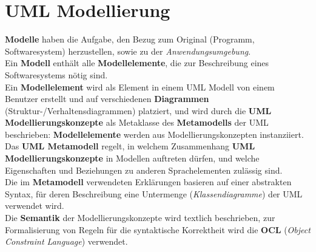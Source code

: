\section{UML Modellierung}

\begin{tcolorbox}[title=UML Modellierung]
    \textbf{Modelle} haben die Aufgabe, den Bezug zum Original (Programm, Softwaresystem) herzustellen, sowie zu der \textit{Anwendungsumgebung}.\\
    Ein \textbf{Modell} enthält alle \textbf{Modellelemente}, die zur Beschreibung eines Softwaresystems nötig sind.\\

    \noindent
    Ein \textbf{Modellelement} wird als Element in einem UML Modell von einem Benutzer erstellt und auf verschiedenen \textbf{Diagrammen} (Struktur-/Verhaltensdiagrammen) platziert, und wird durch die \textbf{UML Modellierungskonzepte} als Metaklasse des \textbf{Metamodells} der UML beschrieben: \textbf{Modellelemente} werden aus Modellierungskonzepten instanziiert.\\

    \noindent
       Das \textbf{UML Metamodell} regelt, in welchem Zusammenhang \textbf{UML Modellierungskonzepte} in Modellen auftreten dürfen, und welche Eigenschaften und Beziehungen zu anderen Sprachelementen zulässig sind.\\

       \noindent
       Die im \textbf{Metamodell} verwendeten Erklärungen basieren auf einer abstrakten Syntax, für deren Beschreibung eine Untermenge (\textit{Klassendiagramme}) der UML verwendet wird.\\
        Die \textbf{Semantik} der Modellierungskonzepte wird textlich beschrieben, zur Formalisierung von Regeln für die syntaktische Korrektheit wird die \textbf{OCL} (\textit{Object Constraint Language}) verwendet.
\end{tcolorbox}
